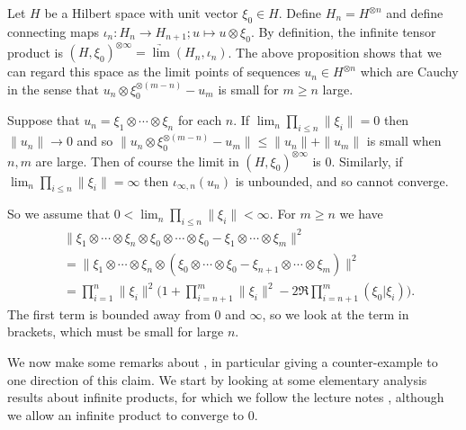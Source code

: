 \documentclass[twoside,a4paper,12pt]{article}
\theoremstyle{plain}
\theoremstyle{definition}
\begin{document}
Let $H$ be a Hilbert space with unit vector $\xi_0\in H$.  Define $H_n = H^{\otimes n}$ and define connecting maps $\iota_n \colon H_n \to H_{n+1}; u \mapsto u\otimes\xi_0$.  By definition, the infinite tensor product is $(H,\xi_0)^{\otimes\infty} = \underrightarrow{\lim} (H_n,\iota_n)$.  The above proposition shows that we can regard this space as the limit points of sequences $u_n \in H^{\otimes n}$ which are Cauchy in the sense that $u_n \otimes \xi_0^{\otimes (m-n)} - u_m$ is small for $m\geq n$ large.

Suppose that $u_n = \xi_1 \otimes \cdots \otimes \xi_n$ for each $n$.  If $\lim_n \prod_{i\leq n} \|\xi_i\| = 0$ then $\|u_n\|\to 0$ and so $\| u_n \otimes \xi_0^{\otimes(m-n)} - u_m\| \leq \|u_n\| + \|u_m\|$ is small when $n,m$ are large.  Then of course the limit in $(H,\xi_0)^{\otimes\infty}$ is $0$.  Similarly, if $\lim_n \prod_{i\leq n} \|\xi_i\| = \infty$ then $\iota_{\infty,n}(u_n)$ is unbounded, and so cannot converge.

So we assume that $0 < \lim_n \prod_{i\leq n} \|\xi_i\| < \infty$.
For $m\geq n$ we have
\begin{align*}
& \| \xi_1\otimes\cdots\otimes\xi_n\otimes\xi_0\otimes\cdots\otimes\xi_0 - \xi_1\otimes\cdots\otimes\xi_m \|^2 \\
&= \| \xi_1\otimes\cdots\otimes\xi_n\otimes(\xi_0\otimes\cdots\otimes\xi_0 - \xi_{n+1}\otimes\cdots\otimes\xi_m) \|^2 \\
&= \prod_{i=1}^n \|\xi_i\|^2 \Big( 1 + \prod_{i={n+1}}^m \|\xi_i\|^2 - 2\Re \prod_{i={n+1}}^m (\xi_0|\xi_i) \Big).
\end{align*}
The first term is bounded away from $0$ and $\infty$, so we look at the term in brackets, which must be small for large $n$.

We now make some remarks about \cite[Lemma~XIV.1.7]{tak3}, in particular giving a counter-example to one direction of this claim.  We start by looking at some elementary analysis results about infinite products, for which we follow the lecture notes \cite{leonard}, although we allow an infinite product to converge to $0$.
\end{document}
